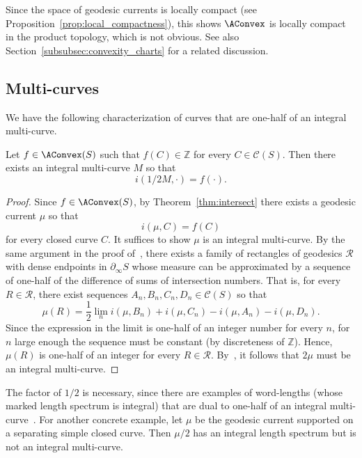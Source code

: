 \begin{remark}
Since the space of geodesic currents is locally compact (see Proposition~\ref{prop:local_compactness}), this shows $\AConvex$ is locally compact in the product topology, which is not obvious.
See also Section~\ref{subsubsec:convexity_charts} for a related discussion.
\end{remark}

\subsection{Multi-curves}

We have the following characterization of curves that are one-half of an integral multi-curve.

\begin{corollary}
Let $f \in \AConvex(S)$ such that $f(C) \in \mathbb{Z}$ for every $C \in \mathcal{C}(S)$. Then there exists an integral multi-curve $M$ so that
\[
i(1/2 M,\cdot)=f(\cdot).
\]
\label{cor:int_multicurve}
\end{corollary}
\begin{proof}
Since $f \in \AConvex(S)$, by Theorem~\ref{thm:intersect} there exists a geodesic current $\mu$ so that
\[
i(\mu, C) = f(C)
\]
for every closed curve $C$.
It suffices to show $\mu$ is an integral multi-curve. By the same argument in the proof of~\cite[Th\'eor\`eme~1]{Otal90:SpectreMarqueNegative}, there exists a family of rectangles of geodesics $\mathcal{R}$ with dense endpoints in $\partial_{\infty} S$ whose measure can be approximated by a sequence of one-half of the difference of sums of intersection numbers. That is, for every $R \in \mathcal{R}$, there exist sequences $A_n, B_n, C_n, D_n \in \mathcal{C}(S)$ so that
\[
\mu(R) = \frac{1}{2}\lim_n i(\mu, B_n) + i(\mu, C_n) - i(\mu, A_n) - i(\mu, D_n).
\]
Since the expression in the limit is one-half of an integer number for every $n$, for $n$ large enough the sequence must be constant (by discreteness of $\mathbb{Z}$).
Hence, $\mu(R)$ is one-half of an integer for every $R \in \mathcal{R}$.
By~\cite[Proposition~4.12]{BIPP24:PositiveCrossratios}, it follows that $2\mu$ must be an integral multi-curve.
\end{proof}

\begin{remark}
  The factor of $1/2$ is necessary, since there are examples of
  word-lengths (whose marked length spectrum is integral) that are
  dual to one-half of an integral
  multi-curve~\cite[Theorem~1.1]{Erlandsson:WordLength}. For another
  concrete example, let $\mu$ be the geodesic current supported on a
  separating simple closed curve. Then $\mu/2$ has an integral
  length spectrum but is not an integral multi-curve.
\end{remark}

